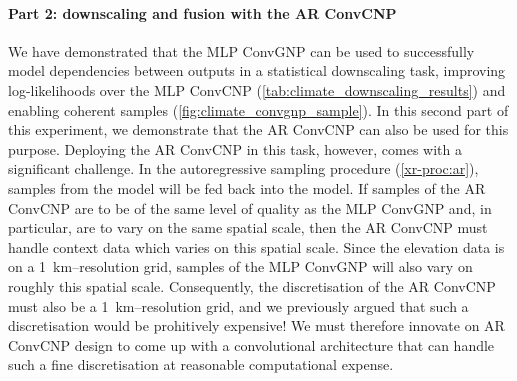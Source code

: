 \documentclass[12pt, twoside]{report}
\newcommand{\xrprefix}[1]{xr-#1}
\begin{document}
\paragraph{Part 2: downscaling and fusion with the AR ConvCNP}
We have demonstrated that the MLP ConvGNP can be used to successfully model dependencies between outputs in a statistical downscaling task, improving log-likelihoods over the MLP ConvCNP (\cref{tab:climate_downscaling_results}) and enabling coherent samples (\cref{fig:climate_convgnp_sample}).
In this second part of this experiment, we demonstrate that the AR ConvCNP can also be used for this purpose.
Deploying the AR ConvCNP in this task, however, comes with a significant challenge.
In the autoregressive sampling procedure (\cref{\xrprefix{proc:ar}}), samples from the model will be fed back into the model.
If samples of the AR ConvCNP are to be of the same level of quality as the MLP ConvGNP and, in particular, are to vary on the same spatial scale, then the AR ConvCNP must handle context data which varies on this spatial scale.
Since the elevation data is on a \SI{1}{km}--resolution grid, samples of the MLP ConvGNP will also vary on roughly this spatial scale.
Consequently, the discretisation of the AR ConvCNP must also be a \SI{1}{km}--resolution grid, and
we previously argued that such a discretisation would be prohitively expensive!
We must therefore innovate on AR ConvCNP design to come up with a convolutional architecture that can handle such a fine discretisation at reasonable computational expense.
\end{document}
